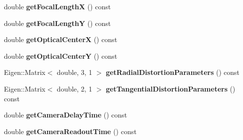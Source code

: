 \begin{DoxyCompactItemize}
\item 
\hypertarget{class_calibration_ab8e718f8167cbc0d15cb90983175ce9d}{double {\bfseries get\-Focal\-Length\-X} () const }\label{class_calibration_ab8e718f8167cbc0d15cb90983175ce9d}

\item 
\hypertarget{class_calibration_af25283fd143f9f8e4026afadff66188f}{double {\bfseries get\-Focal\-Length\-Y} () const }\label{class_calibration_af25283fd143f9f8e4026afadff66188f}

\item 
\hypertarget{class_calibration_aa101a7999e6eec103dce4ec651c2218b}{double {\bfseries get\-Optical\-Center\-X} () const }\label{class_calibration_aa101a7999e6eec103dce4ec651c2218b}

\item 
\hypertarget{class_calibration_a7486353559a45d424afb1aa6fbfa9f24}{double {\bfseries get\-Optical\-Center\-Y} () const }\label{class_calibration_a7486353559a45d424afb1aa6fbfa9f24}

\item 
\hypertarget{class_calibration_a57798a33c441afe2e0b675008e962af6}{Eigen\-::\-Matrix$<$ double, 3, 1 $>$ {\bfseries get\-Radial\-Distortion\-Parameters} () const }\label{class_calibration_a57798a33c441afe2e0b675008e962af6}

\item 
\hypertarget{class_calibration_ab42ba1d8120e3c22b85204c5dfd98f7f}{Eigen\-::\-Matrix$<$ double, 2, 1 $>$ {\bfseries get\-Tangential\-Distortion\-Parameters} () const }\label{class_calibration_ab42ba1d8120e3c22b85204c5dfd98f7f}

\item 
\hypertarget{class_calibration_a22c6544bba616210e34f9020479a32c6}{double {\bfseries get\-Camera\-Delay\-Time} () const }\label{class_calibration_a22c6544bba616210e34f9020479a32c6}

\item 
\hypertarget{class_calibration_aecbab0b6d724fa68f5af6e038111284b}{double {\bfseries get\-Camera\-Readout\-Time} () const }\label{class_calibration_aecbab0b6d724fa68f5af6e038111284b}

\end{DoxyCompactItemize}
